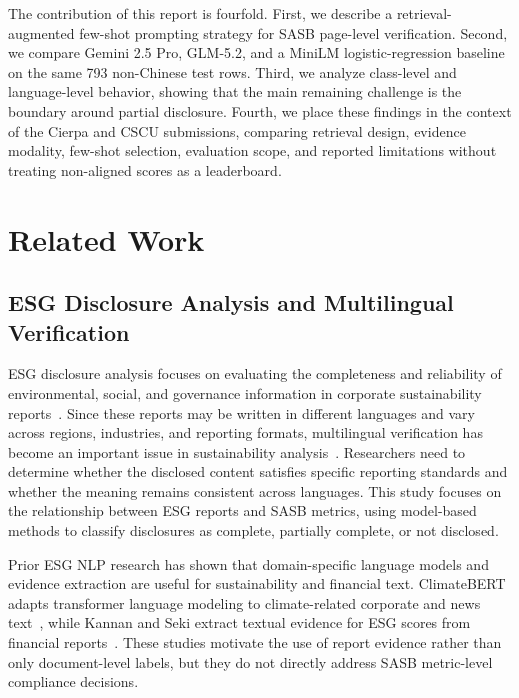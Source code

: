 \documentclass[sigconf,article]{acmart}
\newcommand{\retraug}{retrieval\allowbreak-augmented}
\newcommand{\logreg}{logistic\allowbreak-regression}
\begin{document}
The contribution of this report is fourfold. First, we describe a \retraug{} few-shot prompting strategy for SASB page-level verification. Second, we compare Gemini 2.5 Pro, GLM-5.2, and a MiniLM \logreg{} baseline on the same 793 non-Chinese test rows. Third, we analyze class-level and language-level behavior, showing that the main remaining challenge is the boundary around partial disclosure. Fourth, we place these findings in the context of the Cierpa and CSCU submissions, comparing retrieval design, evidence modality, few-shot selection, evaluation scope, and reported limitations without treating non-aligned scores as a leaderboard.

\section{Related Work}
\subsection{ESG Disclosure Analysis and Multilingual Verification}
ESG disclosure analysis focuses on evaluating the completeness and reliability of environmental, social, and governance information in corporate sustainability reports~\cite{schmoll2025automated}. Since these reports may be written in different languages and vary across regions, industries, and reporting formats, multilingual verification has become an important issue in sustainability analysis~\cite{li2024evaluating}. Researchers need to determine whether the disclosed content satisfies specific reporting standards and whether the meaning remains consistent across languages. This study focuses on the relationship between ESG reports and SASB metrics, using model-based methods to classify disclosures as complete, partially complete, or not disclosed.

Prior ESG NLP research has shown that domain-specific language models and evidence extraction are useful for sustainability and financial text. ClimateBERT adapts transformer language modeling to climate-related corporate and news text~\cite{webersinke2022climatebert}, while Kannan and Seki extract textual evidence for ESG scores from financial reports~\cite{kannan2023textual}. These studies motivate the use of report evidence rather than only document-level labels, but they do not directly address SASB metric-level compliance decisions.
\end{document}
